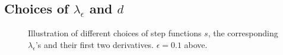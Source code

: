 





\subsection{Choices of $\lambda_\epsilon$ and $d$} \label{appendix:lambda:d}


\begin{figure}[t]
    \centering
    \vspace{-1.8em}
    \caption{Illustration of different choices of step functions $s$, the corresponding $\lambda_\epsilon$'s and their first two derivatives. $\epsilon=0.1$ above.}
    \label{fig:lambda}
    \vspace{-1em}
\end{figure}


